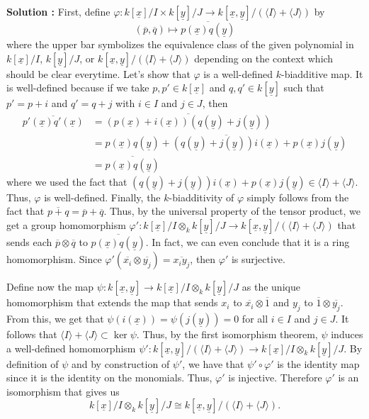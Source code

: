 \documentclass{article}
\newcommand{\isomorphic}{\cong}
\begin{document}
\noindent \textbf{Solution :} First, define $\varphi : k[\underline{x}]/I \times k[\underline{y}]/J \to k[\underline{x}, \underline{y}] / (\langle I \rangle + \langle J \rangle)$ by
$$\left(\overline{p}, \overline{q}\right) \mapsto \overline{p(\underline{x})q(\underline{y})}$$
where the upper bar symbolizes the equivalence class of the given polynomial in $k[\underline{x}]/I$, $k[\underline{y}]/J$, or $k[\underline{x}, \underline{y}] / (\langle I \rangle + \langle J \rangle)$ depending on the context which should be clear everytime. Let's show that $\varphi$ is a well-defined $k$-biadditive map. It is well-defined because if we take $p, p' \in k[\underline{x}]$ and $q, q' \in k[\underline{y}]$ such that $p' = p + i$ and $q' = q + j$ with $i \in I$ and $j \in J$, then
\begin{align*}
    \overline{p'(\underline{x})q'(\underline{x})} &= \overline{(p(\underline{x}) + i(\underline{x}))(q(\underline{y}) + j(\underline{y}))} \\
    &= \overline{p(\underline{x})q(\underline{y}) + (q(\underline{y}) + j(\underline{y}))i(\underline{x}) + p(\underline{x})j(\underline{y})} \\
    &= \overline{p(\underline{x})q(\underline{y})}
\end{align*} 
where we used the fact that $(q(\underline{y}) + j(\underline{y}))i(\underline{x}) + p(\underline{x})j(\underline{y}) \in \langle I \rangle + \langle J \rangle$. Thus, $\varphi$ is well-defined. Finally, the $k$-biadditivity of $\varphi$ simply follows from the fact that $\overline{p + q} = \overline{p} + \overline{q}$. Thus, by the universal property of the tensor product, we get a group homomorphism $\varphi' : k[\underline{x}]/I \otimes_k k[\underline{y}]/J \to k[\underline{x}, \underline{y}] / (\langle I \rangle + \langle J \rangle)$ that sends each $\overline{p} \otimes \overline{q}$ to $\overline{p(\underline{x})q(\underline{y})}$. In fact, we can even conclude that it is a ring homomorphism. Since $\varphi'(\overline{x_i} \otimes \overline{y_j}) = \overline{x_i y_j}$, then $\varphi'$ is surjective.

Define now the map $\psi : k[\underline{x}, \underline{y}] \to k[\underline{x}]/I \otimes_k k[\underline{y}]/J$ as the unique homomorphism that extends the map that sends $x_i$ to $\overline{x_i} \otimes \overline{1}$ and $y_j$ to $\overline{1} \otimes \overline{y_j}$. From this, we get that $\psi(i(\underline{x})) = \psi(j(\underline{y})) = 0$ for all $i\in I$ and $j \in J$. It follows that $\langle I \rangle + \langle J \rangle \subset \ker \psi$. Thus, by the first isomorphism theorem, $\psi$ induces a well-defined homomorphism $\psi' : k[\underline{x}, \underline{y}]/(\langle I \rangle + \langle J \rangle) \to k[\underline{x}]/I \otimes_k k[\underline{y}]/J$. By definition of $\psi$ and by construction of $\psi'$, we have that $\psi' \circ \varphi'$ is the identity map since it is the identity on the monomials. Thus, $\varphi'$ is injective. Therefore $\varphi'$ is an isomorphism that gives us 
$$k[\underline{x}]/I \otimes_k k[\underline{y}]/J \isomorphic k[\underline{x}, \underline{y}] / (\langle I \rangle + \langle J \rangle).$$
\end{document}

